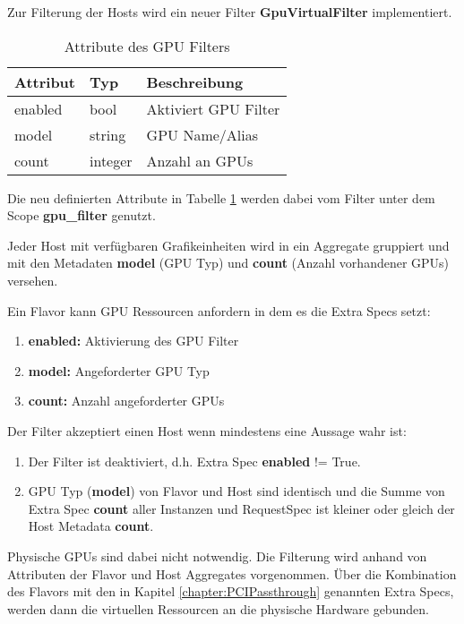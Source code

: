 \documentclass[../Main.tex]{subfiles}
\begin{document}
Zur Filterung der Hosts wird ein neuer Filter \textbf{GpuVirtualFilter} implementiert.

\begin{table}[H]
    \centering
    \caption{Attribute des GPU Filters}
    \renewcommand{\arraystretch}{1.2}
    \begin{tabular}{lll}
        \hline
        \textbf{Attribut} & \textbf{Typ} & \textbf{Beschreibung} \\ 
        \hline
        enabled & bool & Aktiviert GPU Filter \\ 
        model & string & GPU Name/Alias \\ 
        count & integer & Anzahl an GPUs \\ 
        \hline
    \end{tabular}
    \label{table:FilterAttributes}
\end{table}

Die neu definierten Attribute in Tabelle \ref{table:FilterAttributes} werden dabei vom Filter unter dem Scope \textbf{gpu\_filter} genutzt.

Jeder Host mit verfügbaren Grafikeinheiten wird in ein Aggregate gruppiert und mit den Metadaten \textbf{model} (GPU Typ) und \textbf{count} (Anzahl vorhandener GPUs) versehen.

Ein Flavor kann GPU Ressourcen anfordern in dem es die Extra Specs setzt:

\begin{enumerate}
    \item \textbf{enabled:} Aktivierung des GPU Filter
    \item \textbf{model:} Angeforderter GPU Typ
    \item \textbf{count:} Anzahl angeforderter GPUs
\end{enumerate}

Der Filter akzeptiert einen Host wenn mindestens eine Aussage wahr ist:

\begin{enumerate}
    \item Der Filter ist deaktiviert, d.h. Extra Spec \textbf{enabled} != True.
    \item GPU Typ (\textbf{model}) von Flavor und Host sind identisch und
    die Summe von Extra Spec \textbf{count} aller Instanzen und RequestSpec ist kleiner oder gleich der Host Metadata \textbf{count}.
\end{enumerate}

Physische GPUs sind dabei nicht notwendig. Die Filterung wird anhand von Attributen der Flavor und Host Aggregates vorgenommen.
Über die Kombination des Flavors mit den in Kapitel \ref{chapter:PCIPassthrough} genannten Extra Specs, werden dann die virtuellen Ressourcen
an die physische Hardware gebunden.
\end{document}
